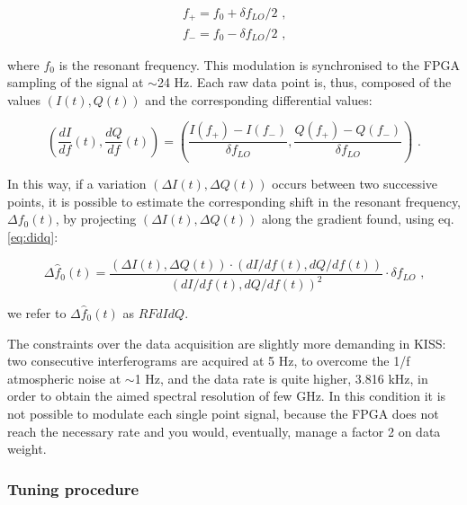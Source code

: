 \documentclass[twocolumn,traditabstract]{aa}\\
\begin{document}
\begin{equation}
\begin{align}
f_+ = f_0 + \delta f_{LO}/2 \text{ ,}
\\
f_- = f_0 - \delta f_{LO}/2 \text{ ,}
\end{align}
\end{equation}

\noindent where $f_0$ is the resonant frequency. This modulation is synchronised to the FPGA sampling of the signal at $\sim$24 Hz. Each raw data point is, thus, composed of the values $(I(t), Q(t))$ and the corresponding differential values:

\begin{equation}
\left( \frac{dI}{df}(t),\frac{dQ}{df}(t) \right) = \left( \frac{I(f_+)-I(f_-)}{\delta f_{LO}}, \frac{Q(f_+)-Q(f_-)}{\delta f_{LO}} \right) \text{ .}
\label{eq:didq}
\end{equation}

\noindent In this way, if a variation $(\Delta I(t), \Delta Q(t))$ occurs between two successive points, it is possible to estimate the corresponding shift in the resonant frequency, $\Delta f_0(t)$, by projecting
$(\Delta I(t), \Delta Q(t))$ along the gradient found, using 
eq. \ref{eq:didq}:

\begin{equation}
\Delta \hat{f}_0 (t) = \frac{(\Delta I(t), \Delta Q(t))\cdot (dI/df(t),dQ/df(t)  ) }{ ( dI/df(t), dQ/df(t) )^2 }\cdot\delta f_{LO} \text{ ,}
\end{equation}

\noindent we refer to $\Delta \hat{f}_0 (t)$ as $RFdIdQ$.

The constraints over the data acquisition are slightly more demanding in KISS: two consecutive interferograms are acquired at 5 Hz, to overcome the 1/f atmospheric noise at $\sim$1 Hz, and the data rate is quite higher, 3.816 kHz, in order to obtain the aimed spectral resolution of few GHz. In this condition it is not possible to modulate each single point signal, because the FPGA does not reach the necessary rate and you would, eventually, manage a factor 2 on data weight.

\subsubsection{Tuning procedure}
\label{sec:tuning}
\end{document}

